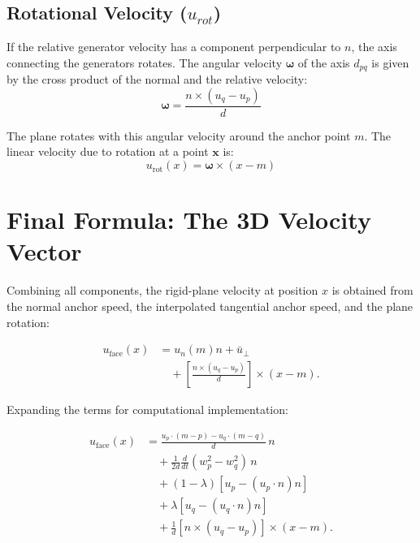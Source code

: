\documentclass[twocolumn]{aastex63}
\newcommand{\vect}[1]{\mathbf{#1}}
\begin{document}
\subsection{Rotational Velocity (${u}_{rot}$)}
If the relative generator velocity has a component perpendicular to $n$, the
axis connecting the generators rotates. The angular velocity
$\boldsymbol{\omega}$ of the axis ${d}_{pq}$ is given by the cross product of
the normal and the relative velocity:
\begin{equation}
    \boldsymbol{\omega} = \frac{{n} \times ({u}_q - {u}_p)}{d}
\end{equation}

The plane rotates with this angular velocity around the anchor point ${m}$. The linear velocity due to rotation at a point $\vect{x}$ is:
\begin{equation}
    {u}_\textrm{rot}({x}) = \boldsymbol{\omega} \times ({x} - {m})
\end{equation}

\section{Final Formula: The 3D Velocity Vector}

Combining all components, the rigid-plane velocity at position $x$ is
obtained from the normal anchor speed, the interpolated tangential anchor
speed, and the plane rotation:

\begin{equation}
    \begin{aligned}
    u_\textrm{face}({x})&=u_n({m}){n}+\bar{u}_{\perp}\\
    &\quad+\left[\frac{{n}\times({u}_q-{u}_p)}{d}\right]
       \times({x}-{m}).
    \end{aligned}
\end{equation}

Expanding the terms for computational implementation:

\begin{equation}
\begin{aligned}
    {u}_\textrm{face}({x})
    &=\frac{{u}_p\cdot({m}-{p})-{u}_q\cdot({m}-{q})}{d}\,{n}\\
    &\quad+\frac{1}{2d}\frac{d}{dt}(w_p^2-w_q^2)\,{n}\\
    &\quad+(1-\lambda)\left[{u}_p-({u}_p\cdot{n}){n}\right]\\
    &\quad+\lambda\left[{u}_q-({u}_q\cdot{n}){n}\right]\\
    &\quad+\frac{1}{d}\left[{n}\times({u}_q-{u}_p)\right]
      \times({x}-{m}).
\end{aligned}
\end{equation}
\end{document}

